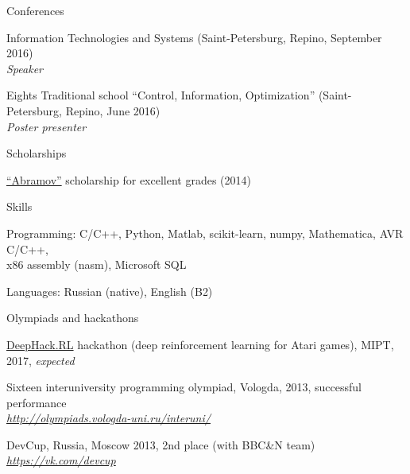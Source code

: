 \documentclass{resume} %
\begin{document}
\begin{rSection}{Conferences}
\item Information Technologies and Systems (Saint-Petersburg, Repino, September 2016)\\
{\em Speaker}
\item Eights Traditional school “Control, Information, Optimization” (Saint-Petersburg, Repino, June 2016)\\
{\em Poster presenter}
\end{rSection}

\begin{rSection}{Scholarships}
\item \href{http://phystech-foundation.org/}{``Abramov''} scholarship for excellent grades (2014)
\end{rSection}

\begin{rSection}{Skills}
\item Programming: C/C++, Python, Matlab, scikit-learn, numpy, Mathematica, AVR C/C++,\\ x86 assembly (nasm), Microsoft SQL
\item Languages: Russian (native), English (B2)
\end{rSection}


\begin{rSection}{Olympiads and hackathons}
\item \href{http://rl.deephack.me/}{DeepHack.RL} hackathon (deep reinforcement learning for Atari games), MIPT, 2017, {\em expected}
\item Sixteen interuniversity programming olympiad, Vologda, 2013, successful performance \\
\hfill {\em \url{http://olympiads.vologda-uni.ru/interuni/}}
\item DevCup, Russia, Moscow 2013, 2nd place (with BBC\&N team)\\
\hfill {\em \url{https://vk.com/devcup}}
\end{rSection}
\end{document}
